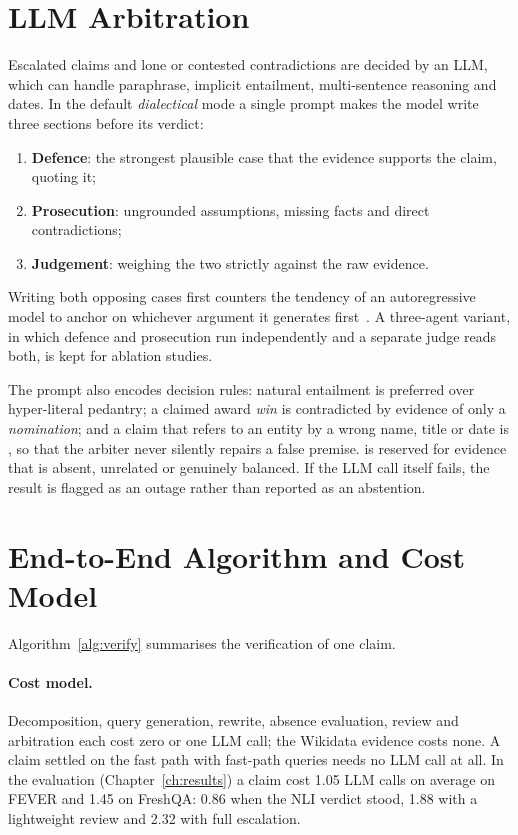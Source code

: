 \section{LLM Arbitration}
\label{sec:arbiter}

Escalated claims and lone or contested contradictions are decided by an LLM, which can handle paraphrase, implicit entailment, multi-sentence reasoning and dates. In the default \emph{dialectical} mode a single prompt makes the model write three sections before its verdict:
\begin{enumerate}[itemsep=0.2em]
  \item \textbf{Defence}: the strongest plausible case that the evidence supports the claim, quoting it;
  \item \textbf{Prosecution}: ungrounded assumptions, missing facts and direct contradictions;
  \item \textbf{Judgement}: weighing the two strictly against the raw evidence.
\end{enumerate}
Writing both opposing cases first counters the tendency of an autoregressive model to anchor on whichever argument it generates first~\citep{du2023improving,liang2023encouraging}. A three-agent variant, in which defence and prosecution run independently and a separate judge reads both, is kept for ablation studies.

The prompt also encodes decision rules: natural entailment is preferred over hyper-literal pedantry; a claimed award \emph{win} is contradicted by evidence of only a \emph{nomination}; and a claim that refers to an entity by a wrong name, title or date is \Con, so that the arbiter never silently repairs a false premise. \Unk{} is reserved for evidence that is absent, unrelated or genuinely balanced. If the LLM call itself fails, the result is flagged as an outage rather than reported as an abstention.

\section{End-to-End Algorithm and Cost Model}
\label{sec:algorithm}

Algorithm~\ref{alg:verify} summarises the verification of one claim.

\paragraph{Cost model.} Decomposition, query generation, rewrite, absence evaluation, review and arbitration each cost zero or one LLM call; the Wikidata evidence costs none. A claim settled on the fast path with fast-path queries needs no LLM call at all. In the evaluation (Chapter~\ref{ch:results}) a claim cost 1.05 LLM calls on average on FEVER and 1.45 on FreshQA: 0.86 when the NLI verdict stood, 1.88 with a lightweight review and 2.32 with full escalation.


